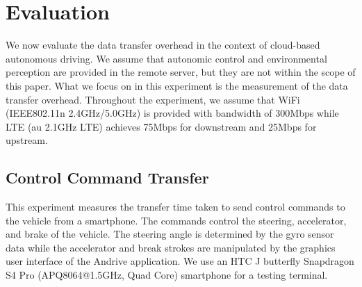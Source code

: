 \section{Evaluation}
\label{sec:evaluation}

We now evaluate the data transfer overhead in the context of cloud-based
autonomous driving.
We assume that autonomic control and environmental perception are
provided in the remote server, but they are not within the scope of this
paper.
What we focus on in this experiment is the measurement of the data
transfer overhead.
Throughout the experiment, we assume that WiFi (IEEE802.11n
2.4GHz/5.0GHz) is provided with bandwidth of 300Mbps while LTE (au
2.1GHz LTE) achieves 75Mbps for downstream and 25Mbps for upstream.

\subsection{Control Command Transfer}

This experiment measures the transfer time taken to send control
commands to the vehicle from a smartphone.
The commands control the steering, accelerator, and brake of the vehicle.
The steering angle is determined by the gyro sensor data while the
accelerator and break strokes are manipulated by the graphics user
interface of the Andrive application.
We use an HTC J butterfly Snapdragon S4 Pro (APQ8064@1.5GHz, Quad Core)
smartphone for a testing terminal.

